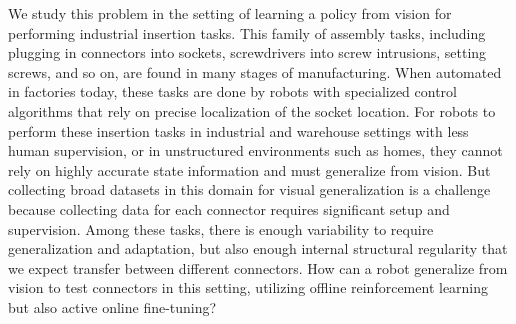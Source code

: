 \documentclass{article}
\begin{document}
We study this problem in the setting of learning a policy from vision for performing industrial insertion tasks.
This family of assembly tasks, including plugging in connectors into sockets, screwdrivers into screw intrusions, setting screws, and so on, are found in many stages of manufacturing.
When automated in factories today, these tasks are done by robots with specialized control algorithms that rely on precise localization of the socket location.
For robots to perform these insertion tasks in industrial and warehouse settings with less human supervision, or in unstructured environments such as homes, they cannot rely on highly accurate state information
and must generalize from vision.
But collecting broad datasets in this domain for visual generalization is a challenge because collecting data for each connector requires significant setup and supervision. 
Among these tasks, there is enough variability to require generalization and adaptation, but also enough internal structural regularity that we expect transfer between different connectors.
How can a robot generalize from vision to test connectors in this setting, utilizing offline reinforcement learning but also active online fine-tuning?
\end{document}

